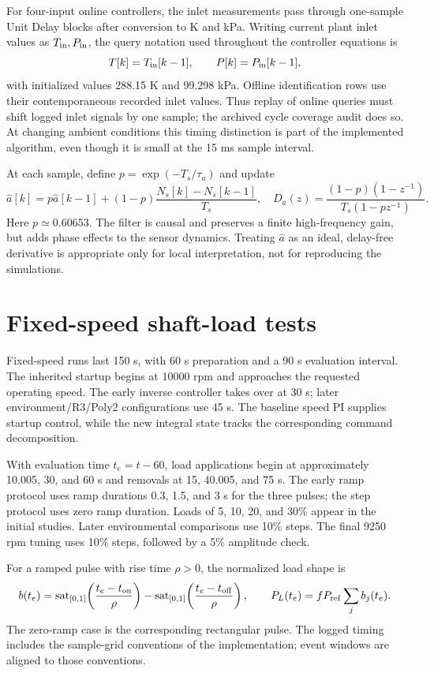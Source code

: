 For four-input online controllers, the inlet measurements pass through one-sample Unit Delay blocks after conversion to K and kPa. Writing current plant inlet values as $T_{\rm in},P_{\rm in}$, the query notation used throughout the controller equations is
\begin{equation}
T[k]=T_{\rm in}[k-1],\qquad P[k]=P_{\rm in}[k-1],
\end{equation}
with initialized values 288.15 K and 99.298 kPa. Offline identification rows use their contemporaneous recorded inlet values. Thus replay of online queries must shift logged inlet signals by one sample; the archived cycle coverage audit does so. At changing ambient conditions this timing distinction is part of the implemented algorithm, even though it is small at the 15 ms sample interval.

At each sample, define $p=\exp(-T_s/\tau_a)$ and update
\begin{equation}
\hat a[k]=p\hat a[k-1]+(1-p)\frac{N_s[k]-N_s[k-1]}{T_s},\quad
D_a(z)=\frac{(1-p)(1-z^{-1})}{T_s(1-pz^{-1})}.
\label{eq:filter}
\end{equation}
Here $p\simeq0.60653$. The filter is causal and preserves a finite high-frequency gain, but adds phase effects to the sensor dynamics. Treating $\hat a$ as an ideal, delay-free derivative is appropriate only for local interpretation, not for reproducing the simulations.

\section{Fixed-speed shaft-load tests}
Fixed-speed runs last 150 s, with 60 s preparation and a 90 s evaluation interval. The inherited startup begins at 10000 rpm and approaches the requested operating speed. The early inverse controller takes over at 30 s; later environment/R3/Poly2 configurations use 45 s. The baseline speed PI supplies startup control, while the new integral state tracks the corresponding command decomposition.

With evaluation time $t_e=t-60$, load applications begin at approximately 10.005, 30, and 60 s and removals at 15, 40.005, and 75 s. The early ramp protocol uses ramp durations 0.3, 1.5, and 3 s for the three pulses; the step protocol uses zero ramp duration. Loads of 5, 10, 20, and 30\% appear in the initial studies. Later environmental comparisons use 10\% steps. The final 9250 rpm tuning uses 10\% steps, followed by a 5\% amplitude check.

For a ramped pulse with rise time $\rho>0$, the normalized load shape is
\begin{equation}
b(t_e)=\operatorname{sat}_{[0,1]}\!\left(\frac{t_e-t_{\rm on}}{\rho}\right)
-\operatorname{sat}_{[0,1]}\!\left(\frac{t_e-t_{\rm off}}{\rho}\right),\qquad
P_L(t_e)=f P_{\rm ref}\sum_j b_j(t_e).
\end{equation}
The zero-ramp case is the corresponding rectangular pulse. The logged timing includes the sample-grid conventions of the implementation; event windows are aligned to those conventions.

